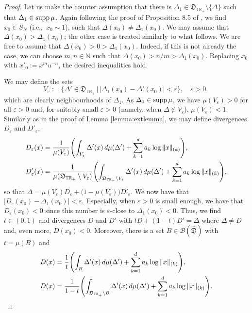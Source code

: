 \documentclass[12pt,a4paper,reqno]{amsart}
\theoremstyle{definition}
\newcommand{\mc}[1]{\mathcal{#1}}
\newcommand{\mf}[1]{\mathfrak{#1}}
\newcommand{\N}{\mathbb N}
\newcommand{\R}{\mathbb R}
\newcommand{\T}{\mathbb T}
\let\originalleft\left
\let\originalright\right
\renewcommand{\left}{\mathopen{}\mathclose\bgroup\originalleft}
\renewcommand{\right}{\aftergroup\egroup\originalright}
\begin{document}
\begin{proof}
Let us make the counter assumption that there is $\Delta_1\in\mf D_{\T\R_+}\setminus\{\Delta\}$ such that $\Delta_1\in{\rm supp}\,\mu$. Again following the proof of Proposition 8.5 of \cite{FritzII}, we find $x_0\in S_N$ (i.e.,\ $x_0\sim 1$), such that $\Delta(x_0)\neq\Delta_1(x_0)$. We may assume that $\Delta(x_0)>\Delta_1(x_0)$; the other case is treated similarly to what follows. We are free to assume that $\Delta(x_0)>0>\Delta_1(x_0)$. Indeed, if this is not already the case, we can choose $m,n\in\N$ such that $\Delta(x_0)>n/m>\Delta_1(x_0)$. Replacing $x_0$ with $x'_0:=x^m u^{-n}$, the desired inequalities hold.

We may define the sets
$$
V_\varepsilon:=\big\{\Delta'\in\mf D_{\T\R_+}\,\big|\,|\Delta_1(x_0)-\Delta'(x_0)|<\varepsilon\big\},\quad\varepsilon>0,
$$
which are clearly neighbourhoods of $\Delta_1$. As $\Delta_1\in{\rm supp}\,\mu$, we have $\mu(V_\varepsilon)>0$ for all $\varepsilon>0$ and, for suitably small $\varepsilon>0$ (namely, when $\Delta\notin V_\varepsilon$), $\mu(V_\varepsilon)<1$. Similarly as in the proof of Lemma \ref{lemma:extlemma}, we may define divergences $D_\varepsilon$ and $D'_\varepsilon$,
\begin{align*}
D_\varepsilon(x)&=\frac{1}{\mu(V_\varepsilon)}\left(\int_{V_\varepsilon}\Delta'(x)\,d\mu(\Delta')+\sum_{k=1}^d a_k\log{\|x\|_{(k)}}\right),\\
D'_\varepsilon(x)&=\frac{1}{\mu(\mf D_{\T\R_+}\setminus V_\varepsilon)}\left(\int_{\mf D_{\T\R_+}\setminus V_\varepsilon}\Delta'(x)\,d\mu(\Delta')+\sum_{k=1}^d a_k\log{\|x\|_{(k)}}\right),
\end{align*}
so that $\Delta=\mu(V_\varepsilon)D_\varepsilon+\big(1-\mu(V_\varepsilon)\big)D'_\varepsilon$. We now have that $|D_\varepsilon(x_0)-\Delta_1(x_0)|<\varepsilon$. Especially, when $\varepsilon>0$ is small enough, we have that $D_\varepsilon(x_0)<0$ since this number is $\varepsilon$-close to $\Delta_1(x_0)<0$. Thus, we find $t\in(0,1)$ and divergences $D$ and $D'$ with $tD+(1-t)D'=\Delta$ where $\Delta\neq D$ and, even more, $D(x_0)<0$. Moreover, there is a set $B\in\mc B(\hat{\mf D})$ with $t=\mu(B)$ and
\begin{align*}
D(x)&=\frac{1}{t}\left(\int_B\Delta'(x)\,d\mu(\Delta')+\sum_{k=1}^d a_k\log{\|x\|_{(k)}}\right),\\
D(x)&=\frac{1}{1-t}\left(\int_{\mf D_{\T\R_+}\setminus B}\Delta'(x)\,d\mu(\Delta')+\sum_{k=1}^d a_k\log{\|x\|_{(k)}}\right).
\end{align*}


\end{proof}
\end{document}
